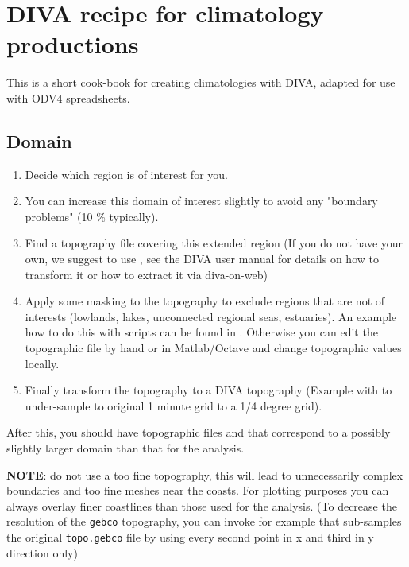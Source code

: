 \documentclass[a4paper,12pt,oneside,notitlepage]{book}
\newcommand{\file}[1]{\texttt{\color{MidnightBlue}{#1}}}
\newcommand{\command}[1]{\texttt{\color{RedOrange}{#1}}}
\newcommand{\diva}{DIVA}
\newcommand{\Diva}{DIVA}
\begin{document}
\chapter{DIVA recipe for climatology productions}


This is a short cook-book for creating climatologies with \Diva, adapted for use with ODV4 spreadsheets.




\section{Domain}

\begin{enumerate}
\item Decide which region is of interest for you. 
\item You can increase this domain of interest slightly to avoid any "boundary problems" (10 \% typically).
\item Find a topography file covering this extended region (If you do not have your own, we suggest to use \command{gebco},  see the {\diva} user manual for details on how to transform it or how to extract it via diva-on-web)
\item Apply some masking to the topography to exclude regions that are not of interests (lowlands, lakes, unconnected regional seas, estuaries). An example how to do this with scripts can be found in \command{gebcoprep*}. Otherwise you can edit the topographic file by hand or in Matlab/Octave and change topographic values locally.
\item Finally transform the topography to a {\diva} topography (Example with \command{gebco2diva 15 15} to under-sample to original 1 minute grid to a 1/4 degree grid).
\end{enumerate}

After this, you should have topographic files \file{topo.grd} and \file{TopoInfo.dat} that correspond to a possibly slightly larger domain than that for the analysis.


{\bf NOTE}: do not use a too fine topography, this will lead to unnecessarily complex boundaries and too fine meshes near the coasts. For plotting purposes you can always overlay finer coastlines than those used for the analysis.
(To decrease the resolution of the {\tt gebco} topography, you can invoke for example \command{gebco2diva 2 3} that sub-samples the original {\tt topo.gebco} file  by using every second point in x and third in y direction only)
\end{document}
